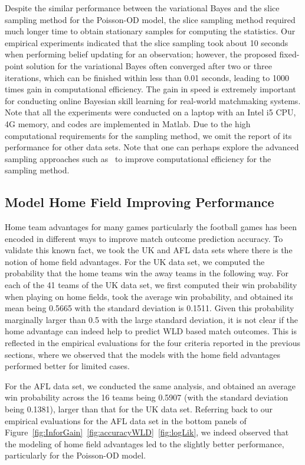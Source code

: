 Despite the similar performance between the variational Bayes and the slice sampling method for the Poisson-OD model, the slice sampling method required much longer time to obtain stationary samples for computing the statistics. Our empirical experiments indicated that the slice sampling took about 10 seconds when performing belief updating for an observation; however, the proposed fixed-point solution for the variational Bayes often converged after two or three iterations, which can be finished within less than 0.01 seconds, leading to 1000 times gain in computational efficiency. The gain in speed is extremely important for conducting online Bayesian skill learning for real-world matchmaking systems. Note that all the experiments were conducted on a laptop with an Intel i5 CPU, 4G memory, and codes are implemented in Matlab. Due to the high computational requirements for the sampling method, we omit the report of its performance for other data sets. Note that one can perhaps explore the advanced sampling approaches such as~\cite{Murray:AISTATS2010} to improve computational efficiency for the sampling method. 

\subsection{Model Home Field Improving Performance}
Home team advantages for many games particularly the football games has been encoded in different ways to improve match outcome prediction accuracy. To validate this known fact, we took the UK and AFL data sets where there is the notion of home field advantages. For the UK data set, we computed the probability that the home teams win the away teams in the following way. For each of the 41 teams of the UK data set, we first computed their win probability when playing on home fields, took the average win probability, and obtained its mean being 0.5665 with the standard deviation is 0.1511. Given this probability marginally larger than 0.5 with the large standard deviation, it is not clear if the home advantage can indeed help to predict WLD based match outcomes. This is reflected in the empirical evaluations for the four criteria reported in the previous sections, where we observed that the models with the home field advantages performed better for limited cases. 

For the AFL data set, we conducted the same analysis, and obtained an average win probability across the 16 teams being 0.5907 (with the standard deviation being 0.1381), larger than that for the UK data set. Referring back to our empirical evaluations for the AFL data set in the bottom panels of Figure~\ref{fig:InforGain}~\ref{fig:accuracyWLD}~\ref{fig:logLik}, we indeed observed that the modeling of home field advantages led to the slightly better performance, particularly for the Poisson-OD model. 